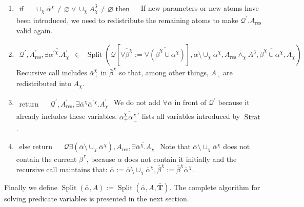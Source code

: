 \documentclass{article}
\newcommand{\assign}{:=}
\newcommand{\tmmathbf}[1]{\ensuremath{\boldsymbol{#1}}}
\newcommand{\tmop}[1]{\ensuremath{\operatorname{#1}}}
\begin{document}
\begin{enumerate}
  \item $\begin{array}{lll}
    \text{if} &  & \cup_{\chi} \bar{\alpha}^{\chi} \neq \varnothing \vee
    \cup_{\chi} A^3_{\chi} \neq \varnothing \text{ \ then}
  \end{array}$ -- If new parameters or new atoms have been introduced, we need
  to redistribute the remaining atoms to make $\mathcal{Q}^{\prime}
  .A_{\tmop{res}}$ valid again.
  
  \item $\begin{array}{lll}
    \mathcal{Q}^{\prime}, A_{\tmop{res}}^{\prime}, \overline{\exists
    \bar{\alpha}^{\prime \chi} .A_{\chi}^{\prime}} & \in & \tmop{Split}
    (\mathcal{Q} [\overline{\forall \bar{\beta}^{\chi}} \assign
    \overline{\forall (\bar{\beta}^{\chi} \cup \bar{\alpha}^{\chi})}],
    \bar{\alpha} \setminus \cup_{\chi} \bar{\alpha}^{\chi}, A_{\tmop{res}}
    \wedge_{\chi} A^3, \overline{\bar{\beta}^{\chi} \cup \bar{\alpha}^{\chi}},
    \overline{A_{\chi}})
  \end{array}$ Recursive call includes $\bar{\alpha}^{\chi}_+$ in
  $\bar{\beta}^{\chi}$ so that, among other things, $A_+$ are redistributed
  into $A_{\chi}$.
  
  \item $\begin{array}{lll}
    \text{return} &  & \mathcal{Q}^{\prime}, A_{\tmop{res}}^{\prime},
    \overline{\exists \bar{\alpha}^{\chi} \bar{\alpha}^{\prime \chi}
    .A_{\chi}^{\prime}}
  \end{array}$ We do not add $\forall \bar{\alpha}$ in front of
  $\mathcal{Q}^{\prime}$ because it already includes these variables.
  $\overline{\bar{\alpha}_+^{\chi} \overline{\alpha_{}}^{\chi}_+^{\prime}}$
  lists all variables introduced by $\tmop{Strat}$.
  
  \item $\begin{array}{lll}
    \text{else return} &  & \mathcal{Q} \exists (\bar{\alpha} \setminus
    \cup_{\chi} \bar{\alpha}^{\chi}), A_{\tmop{res}}, \overline{\exists
    \bar{\alpha}^{\chi} .A_{\chi}}
  \end{array}$ Note that $\bar{\alpha} \setminus \cup_{\chi}
  \bar{\alpha}^{\chi}$ does not contain the current $\bar{\beta}^{\chi}$,
  because $\bar{\alpha}$ does not contain it initially and the recursive call
  maintains that: $\bar{\alpha} \assign \bar{\alpha} \setminus \cup_{\chi}
  \bar{\alpha}^{\chi}, \bar{\beta}^{\chi} \assign \bar{\beta}^{\chi}
  \bar{\alpha}^{\chi}$.
\end{enumerate}
Finally we define $\tmop{Split} (\bar{\alpha}, A) \assign \tmop{Split}
(\bar{\alpha}, A, \bar{\tmmathbf{T}})$. The complete algorithm for solving
predicate variables is presented in the next section.
\end{document}
